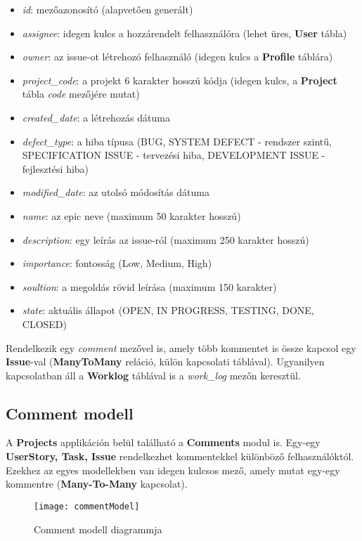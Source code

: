 \begin{itemize}
	\item \textit{id}: mezőazonosító (alapvetően generált)
	\item \textit{assignee}: idegen kulcs a hozzárendelt felhasználóra (lehet üres, \textbf{User} tábla)
	\item \textit{owner}: az issue-ot létrehozó felhasználó (idegen kulcs a \textbf{Profile} táblára)
	\item \textit{project\_code}: a projekt 6 karakter hosszú kódja (idegen kulcs, a \textbf{Project} tábla \textit{code} mezőjére mutat)
	\item \textit{created\_date}: a létrehozás dátuma
	\item \textit{defect\_type}: a hiba típusa (BUG, SYSTEM DEFECT - rendszer szintű, SPECIFICATION ISSUE - tervezési hiba, DEVELOPMENT ISSUE - fejlesztési hiba)
	\item \textit{modified\_date}: az utolsó módosítás dátuma
	\item \textit{name}: az epic neve (maximum 50 karakter hosszú)
	\item \textit{description}: egy leírás az issue-ról (maximum 250 karakter hosszú)
	\item \textit{importance}: fontosság (Low, Medium, High)
	\item \textit{soultion}: a megoldás rövid leírása (maximum 150 karakter)
	\item \textit{state}: aktuális állapot (OPEN, IN PROGRESS, TESTING, DONE, CLOSED)
\end{itemize}

Rendelkezik egy \textit{comment} mezővel is, amely több kommentet is össze kapcsol egy \textbf{Issue}-val (\textbf{ManyToMany} reláció, külön kapcsolati táblával). Ugyanilyen kapcsolatban áll a \textbf{Worklog} táblával is a \textit{work\_log} mezőn keresztül.

\subsection{Comment modell}

A \textbf{Projects} applikáción belül található a \textbf{Comments} modul is. Egy-egy \textbf{UserStory, Task, Issue} rendelkezhet kommentekkel különböző felhasználóktól. Ezekhez az egyes modellekben van idegen kulcsos mező, amely mutat egy-egy kommentre (\textbf{Many-To-Many} kapcsolat). 

\begin{figure}[H]
	\centering
	\texttt{[image: commentModel]}
	\caption{Comment modell diagrammja}
	\label{fig:commentModel}
\end{figure}

